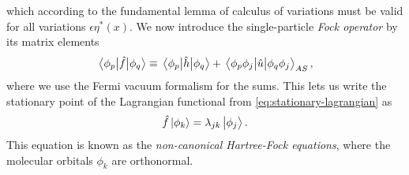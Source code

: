             which according to the fundamental lemma of calculus of variations
            \cite{wiki:fundamental-lemma} must be valid for all variations
            $\epsilon\eta^{*}(x)$.
            We now introduce the single-particle \emph{Fock operator} by
            its matrix elements
            \begin{align}
                \mel{\phi_p}{\hat{f}}{\phi_q}
                \equiv
                \mel{\phi_p}{\hat{h}}{\phi_q}
                +
                \mel{\phi_p\phi_j}{\hat{u}}{\phi_q\phi_j}_{AS},
                \label{eq:fock-mel}
            \end{align}
            where we use the Fermi vacuum formalism for the sums.
            This lets us write the stationary point of the Lagrangian functional
            from \autoref{eq:stationary-lagrangian} as
            \begin{align}
                \hat{f}\ket{\phi_k}
                = \lambda_{jk}\ket{\phi_j}.
                \label{eq:non-canonical-hartree-fock}
            \end{align}
            This equation is known as the \emph{non-canonical Hartree-Fock
            equations}, where the molecular orbitals $\phi_k$ are orthonormal.

